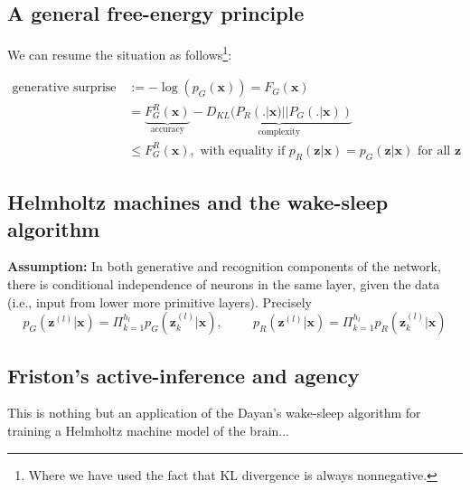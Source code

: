 \documentclass[10pt,letterpaper]{article}
\newtheorem{theorem}{Theorem} \newtheorem{lemma}[theorem]{Lemma}
\def\z{\mathbf{z}}
\def\x{\mathbf{x}}
\begin{document}
\subsection{A general free-energy principle}
We can resume the situation as follows\footnote{Where we have used the fact that KL divergence is always nonnegative.}:
\begin{mdframed}
\begin{equation}
  \begin{split}
    \text{generative surprise } &:= -\log(p_G(\x)) = F_G(\x) \\
    &=\underbrace{F^R_G(\x)}_{\text{accuracy}} - \underbrace{D_{KL}(P_R(.|\x) || P_G(.|\x))}_{\text{complexity}} \\
    &\le F^R_G(\x),
    \text{ with equality if }p_R(\z|\x) = p_G(\z|\x)\text{ for all } \z
    \end{split}
\end{equation}
\end{mdframed}

\subsection{Helmholtz machines and the wake-sleep algorithm}
  \textbf{Assumption:} In both generative and recognition components of the network, there is conditional independence of  neurons in the same layer, given the data (i.e., input from lower more primitive layers). Precisely
$$
p_G(\z^{(l)}|\x) = \Pi_{k=1}^{h_l}p_G(\z_k^{(l)} | \x),\hspace{1cm}
p_R(\z^{(l)}|\x) = \Pi_{k=1}^{h_l}p_R(\z_k^{(l)} |\x)
$$

\subsection{Friston's active-inference and agency}
\label{sec:friston}
This is nothing but an application of the Dayan's wake-sleep algorithm for training a Helmholtz machine model of the brain...
\end{document}
